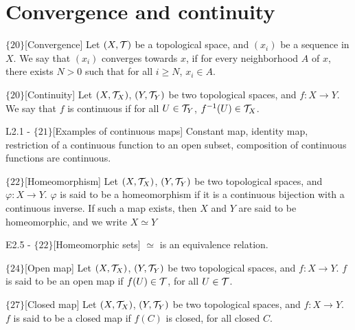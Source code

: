 \documentclass{article}
\begin{document}
\section{Convergence and continuity}

\begin{flexidefinition}{$\{ 20 \}$}[Convergence]
    Let $(X,\mathcal{T})$ be a topological space, and $(x_i)$ be a sequence in $X$. We say that $(x_i)$ converges towards $x$, if for every neighborhood $A$ of $x$, there exists $N > 0$ such that for all $i \geq N$, $x_i \in A$.
\end{flexidefinition}

\begin{flexidefinition}{$\{ 20 \}$}[Continuity]
    Let $(X,\mathcal{T}_X)$, $(Y,\mathcal{T}_Y)$ be two topological spaces, and $f : X \to Y$. We say that $f$ is continuous if for all $U \in \mathcal{T}_Y$, $f^{-1}(U) \in \mathcal{T}_X$. 
\end{flexidefinition}

\begin{flexilemma} {L2.1 - $\{21\}$}[Examples of continuous maps]
    Constant map, identity map, restriction of a continuous function to an open subset, composition of continuous functions are continuous.
\end{flexilemma}

\begin{flexidefinition}{$\{22\}$}[Homeomorphism]
    Let $(X,\mathcal{T}_X)$, $(Y,\mathcal{T}_Y)$ be two topological spaces, and $\varphi : X \to Y$. $\varphi$ is said to be a homeomorphism if it is a continuous bijection with a continuous inverse. If such a map exists, then $X$ and $Y$ are said to be homeomorphic, and we write $X \simeq Y$
\end{flexidefinition}

\begin{flexilemma}{E2.5 - $\{22\}$}[Homeomorphic sets]
    $\simeq$ is an equivalence relation.
\end{flexilemma}

\begin{flexidefinition}{$\{24\}$}[Open map]
    Let $(X,\mathcal{T}_X)$, $(Y,\mathcal{T}_Y)$ be two topological spaces, and $f : X \to Y$. $f$ is said to be an open map if $f(U) \in \mathcal{T}$, for all $U \in \mathcal{T}$.
\end{flexidefinition}

\begin{flexidefinition}{$\{27\}$}[Closed map]
    Let $(X,\mathcal{T}_X)$, $(Y,\mathcal{T}_Y)$ be two topological spaces, and $f : X \to Y$. $f$ is said to be a closed map if $f(C)$ is closed, for all closed $C$.
\end{flexidefinition}
\end{document}
